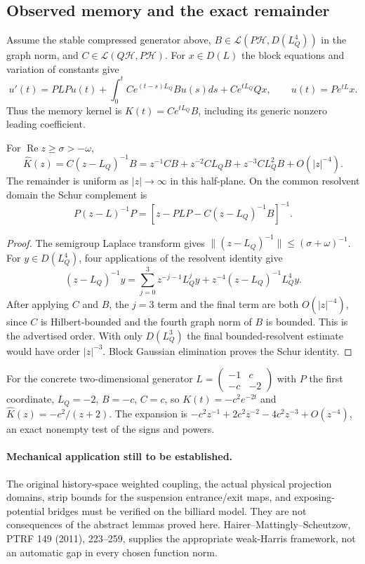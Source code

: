 \subsection{Observed memory and the exact remainder}
Assume the stable compressed generator above, $B\in\mathcal L(P\mathcal H,D(L_Q^4))$ in the graph norm, and $C\in\mathcal L(Q\mathcal H,P\mathcal H)$. For $x\in D(L)$ the block equations and variation of constants give
\[
 u'(t)=PLPu(t)+\int_0^tCe^{(t-s)L_Q}Bu(s)ds+Ce^{tL_Q}Qx,
 \qquad u(t)=Pe^{tL}x.
\]
Thus the memory kernel is $K(t)=Ce^{tL_Q}B$, including its generic nonzero leading coefficient.

\begin{theorem}
\label{thm:r33-a4-memory}
For $\operatorname{Re}z\ge\sigma> -\omega$,
\[
 \widehat K(z)=C(z-L_Q)^{-1}B
 =z^{-1}CB+z^{-2}CL_QB+z^{-3}CL_Q^2B+O(|z|^{-4}).
\]
The remainder is uniform as $|z|\to\infty$ in this half-plane. On the common resolvent domain the Schur complement is
\[
 P(z-L)^{-1}P=[z-PLP-C(z-L_Q)^{-1}B]^{-1}.
\]
\end{theorem}

\begin{proof}
The semigroup Laplace transform gives $\|(z-L_Q)^{-1}\|\le(\sigma+\omega)^{-1}$. For $y\in D(L_Q^4)$, four applications of the resolvent identity give
\[
 (z-L_Q)^{-1}y=\sum_{j=0}^3z^{-j-1}L_Q^jy
                  +z^{-4}(z-L_Q)^{-1}L_Q^4y.
\]
After applying $C$ and $B$, the $j=3$ term and the final term are both $O(|z|^{-4})$, since $C$ is Hilbert-bounded and the fourth graph norm of $B$ is bounded. This is the advertised order. With only $D(L_Q^3)$ the final bounded-resolvent estimate would have order $|z|^{-3}$. Block Gaussian elimination proves the Schur identity.
\end{proof}

For the concrete two-dimensional generator
$L=\left(\begin{smallmatrix}-1&c\\-c&-2\end{smallmatrix}\right)$ with $P$ the first coordinate, $L_Q=-2$, $B=-c$, $C=c$, so $K(t)=-c^2e^{-2t}$ and $\widehat K(z)=-c^2/(z+2)$. The expansion is $-c^2z^{-1}+2c^2z^{-2}-4c^2z^{-3}+O(z^{-4})$, an exact nonempty test of the signs and powers.

\paragraph{Mechanical application still to be established.}
The original history-space weighted coupling, the actual physical projection domains, strip bounds for the suspension entrance/exit maps, and exposing-potential bridges must be verified on the billiard model. They are not consequences of the abstract lemmas proved here. Hairer--Mattingly--Scheutzow, PTRF 149 (2011), 223--259, supplies the appropriate weak-Harris framework, not an automatic gap in every chosen function norm.
